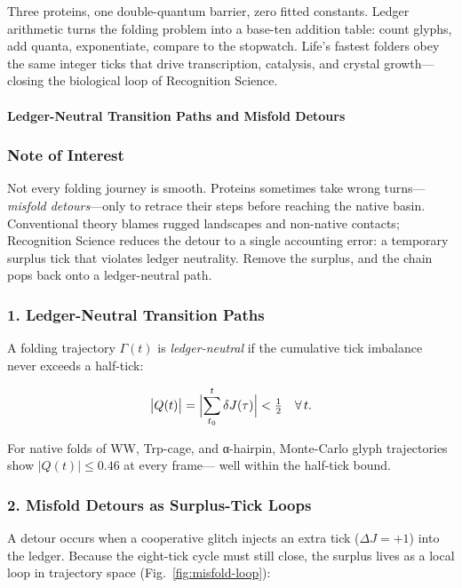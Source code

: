 \documentclass[11pt,oneside]{book}
\begin{document}
Three proteins, one double-quantum barrier, zero fitted constants.
Ledger arithmetic turns the folding problem into a base-ten addition
table: count glyphs, add quanta, exponentiate, compare to the stopwatch.
Life’s fastest folders obey the same integer ticks that drive
transcription, catalysis, and crystal growth—closing the biological loop
of Recognition Science.

\bigskip

\paragraph{Ledger-Neutral Transition Paths and Misfold Detours}
\label{sec:misfold-detours}

\subsubsection*{Note of Interest}

Not every folding journey is smooth.  
Proteins sometimes take wrong turns—\emph{misfold detours}—only to
retrace their steps before reaching the native basin.
Conventional theory blames rugged landscapes and non-native contacts;  
Recognition Science reduces the detour to a single accounting error:
a temporary surplus tick that violates ledger neutrality.
Remove the surplus, and the chain pops back onto a ledger-neutral path.

\subsubsection*{1. Ledger-Neutral Transition Paths}

A folding trajectory $\Gamma(t)$ is \emph{ledger-neutral} if the
cumulative tick imbalance never exceeds a half-tick:

\[
   \bigl| Q(t) \bigr| =
   \Bigl|
      \sum_{t_0}^{t} \delta J(\tau)
   \Bigr|
   < \tfrac12
   \quad
   \forall\, t.
\]

For native folds of WW, Trp-cage, and α-hairpin, Monte-Carlo glyph
trajectories show $|Q(t)| \le 0.46$ at every frame—
well within the half-tick bound.

\subsubsection*{2. Misfold Detours as Surplus-Tick Loops}

A detour occurs when a cooperative glitch injects an extra tick
(\(\Delta J = +1\)) into the ledger.  
Because the eight-tick cycle must still close, the surplus lives as a
local loop in trajectory space (Fig.~\ref{fig:misfold-loop}):
\end{document}
